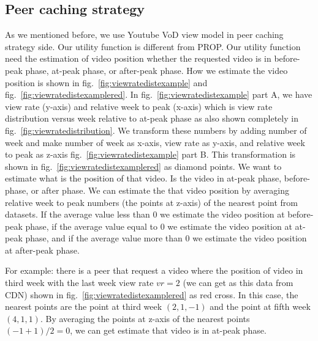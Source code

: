 \documentclass[10pt,final,journal,a4paper]{IEEEtran}
\begin{document}
\subsection{Peer caching strategy}\label{peercachingstrategy}
As we mentioned before, we use Youtube VoD view model in peer caching strategy side. 
Our utility function is different from PROP.
Our utility function need the estimation of video position whether the requested video is in before-peak phase, at-peak phase, or after-peak phase.
How we estimate the video position is shown in fig.~\ref{fig:viewratedistexample} and fig.~\ref{fig:viewratedistexamplered}.
In fig.~\ref{fig:viewratedistexample} part A, we have view rate (y-axis) and relative week to peak (x-axis) which is view rate distribution versus week relative to at-peak phase as also shown completely in fig.~\ref{fig:viewratedistribution}.
We transform these numbers by adding number of week and make number of week as x-axis, view rate 
as y-axis, and relative week to peak as z-axis fig.~\ref{fig:viewratedistexample} part B.
This transformation is shown in fig.~\ref{fig:viewratedistexamplered} as diamond points.
We want to estimate what is the position of that video. 
Is the video in at-peak phase, before-phase, or after phase.  
We can estimate the that video position by averaging relative week to peak numbers (the points at z-axis) of the nearest point from datasets. 
If the average value less than $0$ we estimate the video position at before-peak phase, if the average value equal to $0$ we estimate the video position at at-peak phase,  and if the average value more than $0$ we estimate the video position at after-peak phase.

For example: there is a peer that request a video where the position of video in third week with the last week view rate $vr=2$ (we can get as this data from CDN) shown in fig.~\ref{fig:viewratedistexamplered} as red cross.
In this case, the nearest points are the point at third week $(2,1,-1)$ and the point at fifth week $(4,1,1)$.  
By averaging the points at z-axis of the nearest points $(-1 + 1)/2 = 0$,  we can get estimate that video is in at-peak phase.
\end{document}
